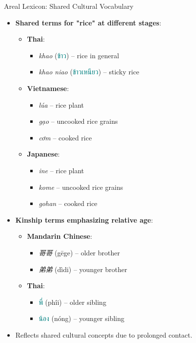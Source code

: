 \documentclass{beamer}
\newcommand{\mtplain}[1]{\textcolor{teal}{#1}}
\newcommand{\tha}[1]{\mtplain{\textthai{#1}}}
\begin{document}
\begin{frame}[allowframebreaks]{Areal Lexicon: Shared Cultural Vocabulary}
    \begin{itemize}
        \item \textbf{Shared terms for "rice" at different stages}:
            \begin{itemize}
                \item \textbf{Thai}:
                    \begin{itemize}
                        \item \textit{khao} (\tha{ข้าว}) – rice in general
                        \item \textit{khao niao} (\tha{ข้าวเหนียว}) – sticky rice
                    \end{itemize}
                  \item \textbf{Vietnamese}:
                    \begin{itemize}
                    \item \textit{lúa} – rice plant
                    \item \textit{gạo} – uncooked rice grains
                    \item \textit{cơm} – cooked rice
                    \end{itemize}
                  \item \textbf{Japanese}:
                    \begin{itemize}
                    \item {} \textit{ine} – rice plant
                    \item {} \textit{kome} – uncooked rice grains
                    \item {} \textit{gohan} – cooked rice
                    \end{itemize}
                  \end{itemize}
                  \framebreak
        \item \textbf{Kinship terms emphasizing relative age}:
            \begin{itemize}
                \item \textbf{Mandarin Chinese}:
                    \begin{itemize}
                        \item \textit{哥哥} (gēge) – older brother
                        \item \textit{弟弟} (dìdi) – younger brother
                    \end{itemize}
                \item \textbf{Thai}:
                    \begin{itemize}
                        \item \tha{พี่} (phîi) – older sibling
                        \item \tha{น้อง} (nóng) – younger sibling
                    \end{itemize}
            \end{itemize}
        \item Reflects shared cultural concepts due to prolonged contact.
    \end{itemize}
\end{frame}
\end{document}
